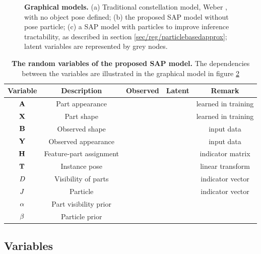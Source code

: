 \begin{figure}[ht]
\begin{subfigure}[t]{0.48\linewidth}
	\label{fig/reg/graphicalModelParticle}
\end{subfigure}
\caption{\textbf{Graphical models.} (a) Traditional constellation model, \eg Weber \etal \cite{Weber2000}, with no object pose defined; (b) the proposed SAP model without pose particle; (c) a SAP model with particles to improve inference tractability, as described in section \ref{sec/reg/particlebasedapprox}; latent variables are represented by grey nodes.}
\label{fig/reg/graphicalmodel}
\end{figure} 

\begin{table}[!th]
	\centering	
	\begin{tabular}{|c|c|c|c|c|}
		\hline	
		\textbf{Variable} & \textbf{Description} & \textbf{Observed} & \textbf{Latent}& \textbf{Remark}\\ 
		\hline \hline
		$\mathbf{A}$ & Part appearance & & & learned in training \\
		$\mathbf{X}$ & Part shape & & & learned in training \\
		$\mathbf{B}$ & Observed shape & \checkmark & & input data \\
		$\mathbf{Y}$ & Observed appearance & \checkmark & & input data\\
		$\mathbf{H}$ & Feature-part assignment & \checkmark & & indicator matrix \\ 
		\hline	
		$\mathbf{T}$ & Instance pose & & & linear transform \\ 
		\hline	
		${D}$ & Visibility of parts & & \checkmark & indicator vector \\
		${J}$ & Particle & & \checkmark & indicator vector \\ 
		\hline
		${\alpha}$ & Part visibility prior & & & \\
		${\beta}$ & Particle prior & & & \\
		\hline 
	\end{tabular}
	\caption{\textbf{The random variables of the proposed SAP model.} The dependencies between the variables are illustrated in the graphical model in figure \ref{fig/reg/graphicalmodel}}
	\label{tab/reg/graphicalmodel}
\end{table}

\subsection{Variables}

